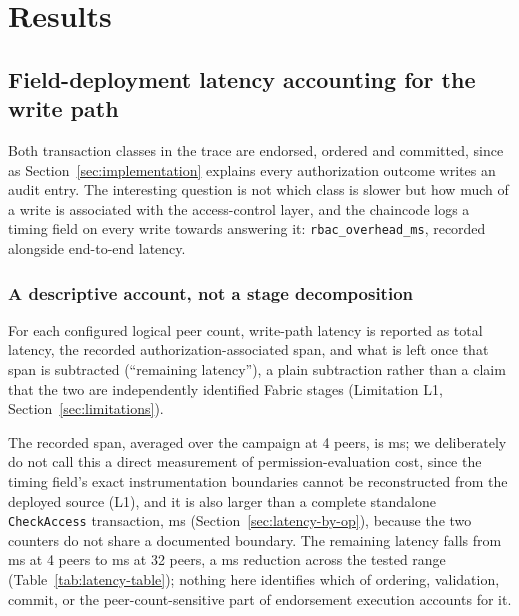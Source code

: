\section{Results}
\label{sec:results}

\subsection{Field-deployment latency accounting for the write path}
\label{sec:results-latency-accounting}

Both transaction classes in the trace are endorsed, ordered and committed, since as Section~\ref{sec:implementation} explains every authorization outcome writes an audit entry. The interesting question is not which class is slower but how much of a write is associated with the access-control layer, and the chaincode logs a timing field on every write towards answering it: \texttt{rbac\_overhead\_ms}, recorded alongside end-to-end latency.

\subsubsection{A descriptive account, not a stage decomposition}

For each configured logical peer count, write-path latency is reported as total latency, the recorded authorization-associated span, and what is left once that span is subtracted (``remaining latency''), a plain subtraction rather than a claim that the two are independently identified Fabric stages (Limitation L1, Section~\ref{sec:limitations}).

The recorded span, averaged over the campaign at 4 peers, is \SpanLatencyPeerFour{} ms; we deliberately do not call this a direct measurement of permission-evaluation cost, since the timing field's exact instrumentation boundaries cannot be reconstructed from the deployed source (L1), and it is also larger than a complete standalone \texttt{CheckAccess} transaction, \CheckAccessMeanMs{} ms (Section~\ref{sec:latency-by-op}), because the two counters do not share a documented boundary. The remaining latency falls from \RemainingLatencyPeerFour{} ms at 4 peers to \RemainingLatencyPeerThirtyTwo{} ms at 32 peers, a \RemainingLatencyDiffFourVThirtyTwo{} ms reduction across the tested range (Table~\ref{tab:latency-table}); nothing here identifies which of ordering, validation, commit, or the peer-count-sensitive part of endorsement execution accounts for it.

